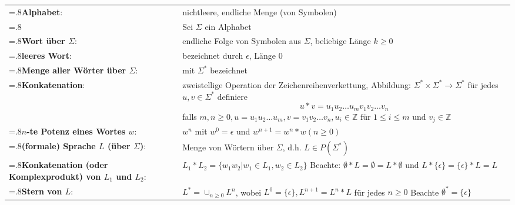 \documentclass{article}
\begin{document}
\begin{tabularx}{\textwidth}{>{\hsize=.8\hsize} X X}
  \textbf{Alphabet}: & nichtleere, endliche Menge (von Symbolen) \\
  & Sei $\Sigma$ ein Alphabet \\
  \textbf{Wort über $\Sigma$}: & endliche Folge von Symbolen aus $\Sigma$, beliebige Länge $k \geq 0$ \\
  \textbf{leeres Wort}: & bezeichnet durch $\epsilon$, Länge 0 \\
  \textbf{Menge aller Wörter über $\Sigma$}: & mit $\Sigma^*$ bezeichnet \\
  \textbf{Konkatenation}: & zweistellige Operation der Zeichenreihenverkettung,
  Abbildung: $\Sigma^* \times \Sigma^* \to \Sigma^*$ für jedes $u, v \in \Sigma^*$ definiere
  \[
    u * v = u_1u_2 \dots u_mv_1v_2 \ldots v_n
  \]
  falls $m,n \geq 0, u = u_1u_2 \ldots u_m, v = v_1v_2 \ldots v_n, u_i \in \mathbb{Z} \text{ für } 1 \leq i \leq m \text{ und } v_j \in \mathbb{Z}$ \\
  \textbf{$n$-te Potenz eines Wortes $w$}: & $w^n$ mit $w^0 = \epsilon$ und $w^{n+1} = w^n * w (n \geq 0)$ \\
  \textbf{(formale) Sprache $L$ (über $\Sigma$)}: & Menge von Wörtern über $\Sigma$, d.h. $L \in \mathit{P}(\Sigma^*)$\\
  \textbf{Konkatenation (oder Komplexprodukt) von $L_1$ und $L_2$}: & $L_1 * L_2 = \{w_1w_2 | w_1 \in L_1, w_2 \in L_2 \}$
  Beachte: $\emptyset * L = \emptyset = L * \emptyset$ und $L * \{ \epsilon \} = \{ \epsilon \} * L = L$ \\
  \textbf{Stern von $L$}: & $L^* = \cup_{n \geq 0}L^n$, wobei $L^0 = \{ \epsilon \}, L^{n + 1} = L^n * L$
  für jedes $n \geq 0$ Beachte $\emptyset^* = \{ \epsilon \}$\\
\end{tabularx}
  
\end{document}
